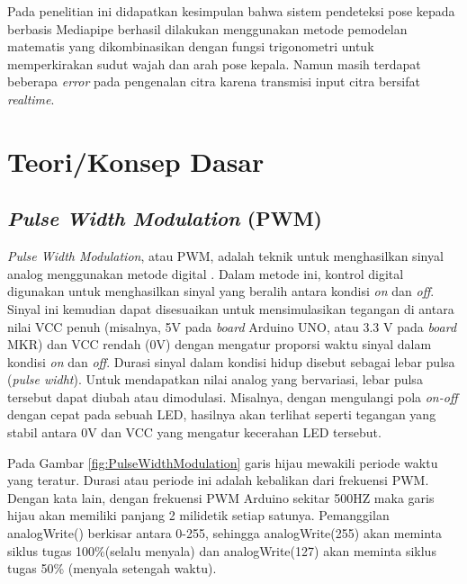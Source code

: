 Pada penelitian ini didapatkan kesimpulan bahwa sistem pendeteksi pose kepada berbasis Mediapipe berhasil dilakukan menggunakan metode pemodelan matematis yang dikombinasikan dengan fungsi trigonometri untuk memperkirakan sudut wajah dan arah pose kepala. Namun masih terdapat beberapa \emph{error} pada pengenalan citra karena transmisi input citra bersifat \emph{realtime}.

\section{Teori/Konsep Dasar}

\subsection{\emph{Pulse Width Modulation} (PWM)}

\emph{Pulse Width Modulation}, atau PWM, adalah teknik untuk menghasilkan sinyal analog menggunakan metode digital \parencite{Hirzel_2024}. Dalam metode ini, kontrol digital digunakan untuk menghasilkan sinyal yang beralih antara kondisi \emph{on} dan \emph{off}. Sinyal ini kemudian dapat disesuaikan untuk mensimulasikan tegangan di antara nilai VCC penuh (misalnya, 5V pada \emph{board} Arduino UNO, atau 3.3 V pada \emph{board} MKR) dan VCC rendah (0V) dengan mengatur proporsi waktu sinyal dalam kondisi \emph{on} dan \emph{off}. Durasi sinyal dalam kondisi hidup disebut sebagai lebar pulsa (\emph{pulse widht}). Untuk mendapatkan nilai analog yang bervariasi, lebar pulsa tersebut dapat diubah atau dimodulasi. Misalnya, dengan mengulangi pola \emph{on-off} dengan cepat pada sebuah LED, hasilnya akan terlihat seperti tegangan yang stabil antara 0V dan VCC yang mengatur kecerahan LED tersebut.

Pada Gambar \ref{fig:PulseWidthModulation} garis hijau mewakili periode waktu yang teratur. Durasi atau periode ini adalah kebalikan dari frekuensi PWM. Dengan kata lain, dengan frekuensi PWM Arduino sekitar 500HZ maka garis hijau akan memiliki panjang 2 milidetik setiap satunya. Pemanggilan analogWrite() berkisar antara 0-255, sehingga analogWrite(255) akan meminta siklus tugas 100\%(selalu menyala) dan analogWrite(127) akan meminta siklus tugas 50\% (menyala setengah waktu).

